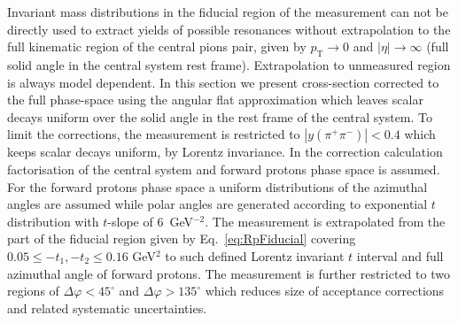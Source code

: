Invariant mass distributions in the fiducial region of the measurement can not be directly used to extract yields of possible resonances without extrapolation to the full kinematic region of the central pions pair, given by $p_\mathrm{T}\rightarrow 0$ and $|\eta|\rightarrow\infty$  (full solid angle in the central system rest frame). Extrapolation to unmeasured region is always model dependent. In this section we present cross-section corrected to the full phase-space using the angular flat approximation which leaves scalar decays uniform over the solid angle in the rest frame of the central system. To limit the corrections, the measurement is restricted to $|y(\pi^+\pi^-)|<0.4$ which keeps scalar decays uniform, by Lorentz invariance. In the correction calculation factorisation of the central system and forward protons phase space is assumed. For the forward protons phase space a uniform distributions of the azimuthal angles are assumed while polar angles are generated according to exponential $t$ distribution with $t$-slope of 6~GeV$^{-2}$. 
The measurement is extrapolated from the part of the fiducial region given by Eq.~\eqref{eq:RpFiducial} covering $0.05 \leq -t_1 , -t_2 \leq 0.16$ GeV$^2$ to such defined Lorentz invariant $t$ interval and full azimuthal angle of forward protons.
The measurement is further restricted to two regions of $\Delta\varphi<45^\circ$ and $\Delta\varphi>135^\circ$ which reduces size of acceptance corrections and related systematic uncertainties.

